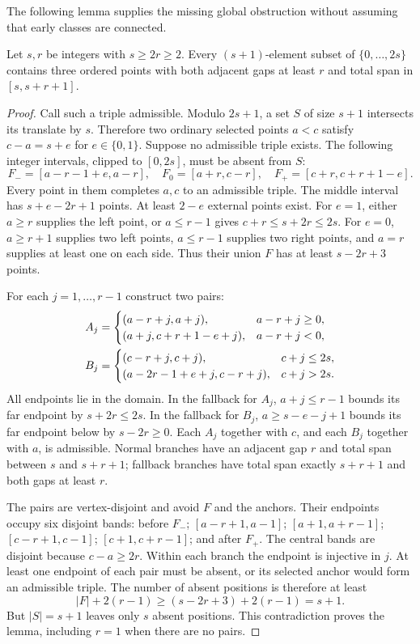 The following lemma supplies the missing global obstruction without assuming that early classes are connected.
\begin{lemma}\label{B-lem:dense}
Let $s,r$ be integers with $s\geq2r\geq2$. Every $(s+1)$-element subset of $\{0,\ldots,2s\}$ contains three ordered points with both adjacent gaps at least $r$ and total span in $[s,s+r+1]$.
\end{lemma}
\begin{proof}
Call such a triple admissible. Modulo $2s+1$, a set $S$ of size $s+1$ intersects its translate by $s$. Therefore two ordinary selected points $a<c$ satisfy $c-a=s+e$ for $e\in\{0,1\}$. Suppose no admissible triple exists. The following integer intervals, clipped to $[0,2s]$, must be absent from $S$:
\begin{equation}\label{B-eq:forced}
F_-=[a-r-1+e,a-r],\quad F_0=[a+r,c-r],\quad F_+=[c+r,c+r+1-e].
\end{equation}
Every point in them completes $a,c$ to an admissible triple. The middle interval has $s+e-2r+1$ points. At least $2-e$ external points exist. For $e=1$, either $a\geq r$ supplies the left point, or $a\leq r-1$ gives $c+r\leq s+2r\leq2s$. For $e=0$, $a\geq r+1$ supplies two left points, $a\leq r-1$ supplies two right points, and $a=r$ supplies at least one on each side. Thus their union $F$ has at least $s-2r+3$ points.

For each $j=1,\ldots,r-1$ construct two pairs:
\begin{align}\label{B-eq:pairs}
A_j&=\begin{cases}(a-r+j,a+j),&a-r+j\geq0,\\(a+j,c+r+1-e+j),&a-r+j<0,\end{cases}\notag\\
B_j&=\begin{cases}(c-r+j,c+j),&c+j\leq2s,\\(a-2r-1+e+j,c-r+j),&c+j>2s.\end{cases}
\end{align}
All endpoints lie in the domain. In the fallback for $A_j$, $a+j\leq r-1$ bounds its far endpoint by $s+2r\leq2s$. In the fallback for $B_j$, $a\geq s-e-j+1$ bounds its far endpoint below by $s-2r\geq0$. Each $A_j$ together with $c$, and each $B_j$ together with $a$, is admissible. Normal branches have an adjacent gap $r$ and total span between $s$ and $s+r+1$; fallback branches have total span exactly $s+r+1$ and both gaps at least $r$.

The pairs are vertex-disjoint and avoid $F$ and the anchors. Their endpoints occupy six disjoint bands: before $F_-$; $[a-r+1,a-1]$; $[a+1,a+r-1]$; $[c-r+1,c-1]$; $[c+1,c+r-1]$; and after $F_+$. The central bands are disjoint because $c-a\geq2r$. Within each branch the endpoint is injective in $j$. At least one endpoint of each pair must be absent, or its selected anchor would form an admissible triple. The number of absent positions is therefore at least
\begin{equation}\label{B-eq:contradiction}
|F|+2(r-1)\geq(s-2r+3)+2(r-1)=s+1.
\end{equation}
But $|S|=s+1$ leaves only $s$ absent positions. This contradiction proves the lemma, including $r=1$ when there are no pairs.
\end{proof}

